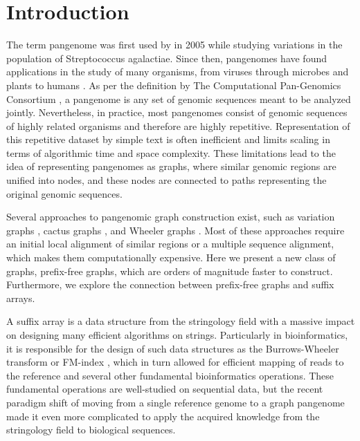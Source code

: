 \section{Introduction}
The term pangenome was first used by \citet{tettelin2005genome} in 2005 while studying variations in the population of Streptococcus agalactiae.
Since then, pangenomes have found applications in the study of many organisms, from viruses \cite{lau2021profiling} through microbes \cite{dutilh2014comparative} and plants \cite{danilevicz2020plant} to humans \cite{wang2022human}.
As per the definition by The Computational Pan-Genomics Consortium \cite{computational2018computational}, a pangenome is any set of genomic sequences meant to be analyzed jointly.
Nevertheless, in practice, most pangenomes consist of genomic sequences of highly related organisms and therefore are highly repetitive.
Representation of this repetitive dataset by simple text is often inefficient and limits scaling in terms of algorithmic time and space complexity.
These limitations lead to the idea of representing pangenomes as graphs, where similar genomic regions are unified into nodes, and these nodes are connected to paths representing the original genomic sequences.

Several approaches to pangenomic graph construction exist, such as variation graphs \cite{church2015extending,garrison2018variation,garrison2023building}, cactus graphs \cite{paten2011cactus,hickey2023pangenome}, and Wheeler graphs \cite{gagie2017wheeler,2022pfwg}.
Most of these approaches require an initial local alignment of similar regions or a multiple sequence alignment, which makes them computationally expensive.
Here we present a new class of graphs, prefix-free graphs, which are orders of magnitude faster to construct.
Furthermore, we explore the connection between prefix-free graphs and suffix arrays.

A suffix array is a data structure from the stringology field with a massive impact on designing many efficient algorithms on strings.
Particularly in bioinformatics, it is responsible for the design of such data structures as the Burrows-Wheeler transform \cite{burrows1994block} or FM-index \cite{ferragina2000opportunistic}, which in turn allowed for efficient mapping of reads to the reference and several other fundamental bioinformatics operations.
These fundamental operations are well-studied on sequential data, but the recent paradigm shift of moving from a single reference genome to a graph pangenome made it even more complicated to apply the acquired knowledge from the stringology field to biological sequences.

